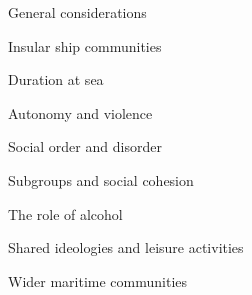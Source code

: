 \setcounter{listWWNumviileveli}{3}
\begin{listWWNumviileveli}
\item 

\setcounter{listWWNumviilevelii}{0}
\begin{listWWNumviilevelii}
\item 
\begin{styleListParagraph}
General considerations
\end{styleListParagraph}
\item 
\begin{styleListParagraph}
Insular ship communities 
\end{styleListParagraph}


\setcounter{listWWNumviileveliii}{0}
\begin{listWWNumviileveliii}
\item 
\begin{styleListParagraph}
Duration at sea
\end{styleListParagraph}
\item 
\begin{styleListParagraph}
Autonomy and violence
\end{styleListParagraph}
\item 
\begin{styleListParagraph}
Social order and disorder 
\end{styleListParagraph}
\item 
\begin{styleListParagraph}
Subgroups and social cohesion
\end{styleListParagraph}
\item 
\begin{styleListParagraph}
The role of alcohol
\end{styleListParagraph}
\item 
\begin{styleListParagraph}
Shared ideologies and leisure activities 
\end{styleListParagraph}
\end{listWWNumviileveliii}
\item 
\begin{styleListParagraph}
Wider maritime communities 
\end{styleListParagraph}



\end{listWWNumviilevelii}
\end{listWWNumviileveli}
